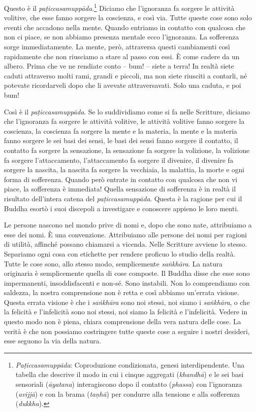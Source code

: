 Questo è il \emph{paṭiccasamuppāda}.\footnote{%
  \emph{Paṭiccasamuppāda}:
  Coproduzione condizionata, genesi interdipendente. Una tabella che
  descrive il modo in cui i cinque aggregati (\emph{khandhā}) e le sei
  basi sensoriali (\emph{āyatana}) interagiscono dopo il contatto
  (\emph{phassa}) con l'ignoranza (\emph{avijjā}) e con la brama
  (\emph{taṇhā}) per condurre alla tensione e alla sofferenza
  (\emph{dukkha}).}
Diciamo che l'ignoranza fa sorgere le attività
volitive, che esse fanno sorgere la coscienza, e così via. Tutte queste
cose sono solo eventi che accadono nella mente. Quando entriamo in
contatto con qualcosa che non ci piace, se non abbiamo presenza mentale
ecco l'ignoranza. La sofferenza sorge immediatamente. La mente, però,
attraversa questi cambiamenti così rapidamente che non riusciamo a stare
al passo con essi. È come cadere da un albero. Prima che ve ne rendiate
conto -- bum! -- siete a terra! In realtà siete caduti attraverso molti
rami, grandi e piccoli, ma non siete riusciti a contarli, né potevate
ricordarveli dopo che li avevate attraversavati. Solo una caduta, e poi
bum!

Così è il \emph{paṭiccasamuppāda}. Se lo suddividiamo come si fa nelle
Scritture, diciamo che l'ignoranza fa sorgere le attività volitive, le
attività volitive fanno sorgere la coscienza, la coscienza fa sorgere la
mente e la materia, la mente e la materia fanno sorgere le sei basi dei
sensi, le basi dei sensi fanno sorgere il contatto, il contatto fa
sorgere la sensazione, la sensazione fa sorgere la volizione, la
volizione fa sorgere l'attaccamento, l'attaccamento fa sorgere il
divenire, il divenire fa sorgere la nascita, la nascita fa sorgere la
vecchiaia, la malattia, la morte e ogni forma di sofferenza. Quando però
entrate in contatto con qualcosa che non vi piace, la sofferenza è
immediata! Quella sensazione di sofferenza è in realtà il risultato
dell'intera catena del \emph{paṭiccasamuppāda}. Questa è la ragione per
cui il Buddha esortò i suoi discepoli a investigare e conoscere appieno
le loro menti.

Le persone nascono nel mondo prive di nomi e, dopo che sono nate,
attribuiamo a esse dei nomi. È una convenzione. Attribuiamo alle persone
dei nomi per ragioni di utilità, affinché possano chiamarsi a vicenda.
Nelle Scritture avviene lo stesso. Separiamo ogni cosa con etichette per
rendere proficuo lo studio della realtà. Tutte le cose sono, allo stesso
modo, semplicemente \emph{saṅkhāra}. La natura originaria è
semplicemente quella di cose composte. Il Buddha disse che esse sono
impermanenti, insoddisfacenti e non-sé. Sono instabili. Non lo
comprendiamo con saldezza, la nostra comprensione non è retta e così
abbiamo un'errata visione. Questa errata visione è che i \emph{saṅkhāra}
sono noi stessi, noi siamo i \emph{saṅkhāra}, o che la felicità e
l'infelicità sono noi stessi, noi siamo la felicità e l'infelicità.
Vedere in questo modo non è piena, chiara comprensione della vera natura
delle cose. La verità è che non possiamo costringere tutte queste cose a
seguire i nostri desideri, esse seguono la via della natura.

